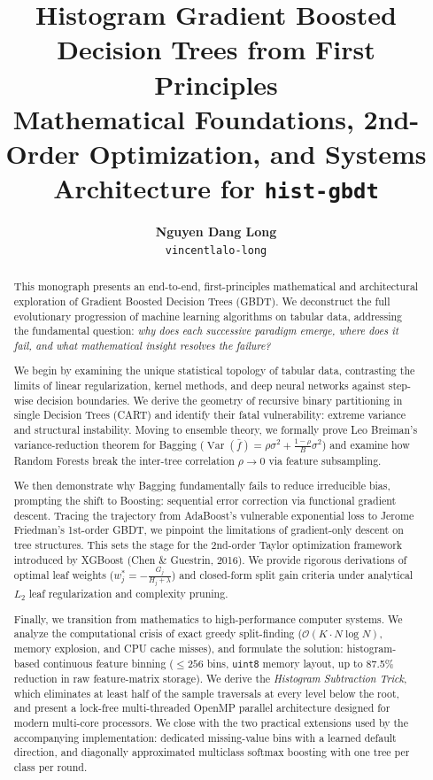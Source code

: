 \documentclass[11pt,a4paper]{article}
\title{\textbf{Histogram Gradient Boosted Decision Trees from First Principles} \\
\large Mathematical Foundations, 2nd-Order Optimization, and Systems Architecture for \texttt{hist-gbdt}}
\author{\textbf{Nguyen Dang Long} \\ \texttt{vincentlalo-long}}
\date{}
\newcommand{\Var}{\operatorname{Var}}
\begin{document}
\maketitle

\begin{abstract}
This monograph presents an end-to-end, first-principles mathematical and architectural exploration of Gradient Boosted Decision Trees (GBDT). We deconstruct the full evolutionary progression of machine learning algorithms on tabular data, addressing the fundamental question: \emph{why does each successive paradigm emerge, where does it fail, and what mathematical insight resolves the failure?}

We begin by examining the unique statistical topology of tabular data, contrasting the limits of linear regularization, kernel methods, and deep neural networks against step-wise decision boundaries. We derive the geometry of recursive binary partitioning in single Decision Trees (CART) and identify their fatal vulnerability: extreme variance and structural instability. Moving to ensemble theory, we formally prove Leo Breiman's variance-reduction theorem for Bagging ($\Var(\bar{f}) = \rho \sigma^2 + \frac{1-\rho}{B}\sigma^2$) and examine how Random Forests break the inter-tree correlation $\rho \to 0$ via feature subsampling. 

We then demonstrate why Bagging fundamentally fails to reduce irreducible bias, prompting the shift to Boosting: sequential error correction via functional gradient descent. Tracing the trajectory from AdaBoost's vulnerable exponential loss to Jerome Friedman's 1st-order GBDT, we pinpoint the limitations of gradient-only descent on tree structures. This sets the stage for the 2nd-order Taylor optimization framework introduced by XGBoost (Chen \& Guestrin, 2016). We provide rigorous derivations of optimal leaf weights ($w_j^* = -\frac{G_j}{H_j + \lambda}$) and closed-form split gain criteria under analytical $L_2$ leaf regularization and complexity pruning. 

Finally, we transition from mathematics to high-performance computer systems. We analyze the computational crisis of exact greedy split-finding ($\mathcal{O}(K \cdot N \log N)$, memory explosion, and CPU cache misses), and formulate the solution: histogram-based continuous feature binning ($\le 256$ bins, \texttt{uint8} memory layout, up to 87.5\% reduction in raw feature-matrix storage). We derive the \emph{Histogram Subtraction Trick}, which eliminates at least half of the sample traversals at every level below the root, and present a lock-free multi-threaded OpenMP parallel architecture designed for modern multi-core processors. We close with the two practical extensions used by the accompanying implementation: dedicated missing-value bins with a learned default direction, and diagonally approximated multiclass softmax boosting with one tree per class per round.
\end{abstract}
\end{document}
